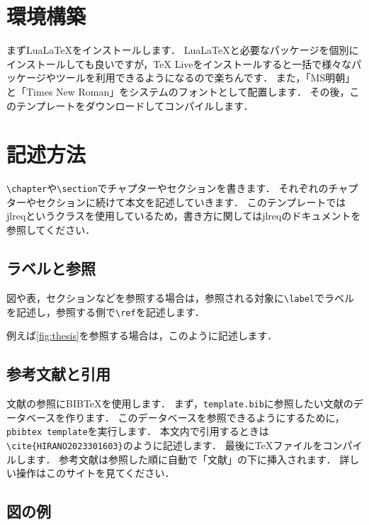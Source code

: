 \documentclass[fontsize=9bp,twocolumn,column_gap=2.36zw,a4paper,report]{jlreq}
\begin{document}
\chapter{環境構築}

まずLua\LaTeX をインストールします．
Lua\LaTeX と必要なパッケージを個別にインストールしても良いですが，TeX Liveをインストールすると一括で様々なパッケージやツールを利用できるようになるので楽ちんです．
また，「MS明朝」と「Times New Roman」をシステムのフォントとして配置します．
その後，このテンプレートをダウンロードしてコンパイルします．
\newline

\chapter{記述方法}

\texttt{\textbackslash chapter}や\texttt{\textbackslash section}でチャプターやセクションを書きます．
それぞれのチャプターやセクションに続けて本文を記述していきます．
このテンプレートではjlreqというクラスを使用しているため，書き方に関してはjlreqのドキュメント\cite{jlreq}を参照してください．

\section{ラベルと参照}

図や表，セクションなどを参照する場合は，参照される対象に\texttt{\textbackslash label}でラベルを記述し，参照する側で\texttt{\textbackslash ref}を記述します．\par
例えば\ref{fig:thesis}を参照する場合は，このように記述します．

\section{参考文献と引用}

文献の参照にBIB\TeX を使用します．
まず，\texttt{template.bib}に参照したい文献のデータベースを作ります．
このデータベースを参照できるようにするために，\texttt{pbibtex template}を実行します．
本文内で引用するときは\texttt{\textbackslash cite\{HIRANO2023301603\}}のように記述します．
最後に\TeX ファイルをコンパイルします．
参考文献は参照した順に自動で「文献」の下に挿入されます．
詳しい操作はこのサイト\cite{bibtex}を見てください．

\section{図の例}
\end{document}

